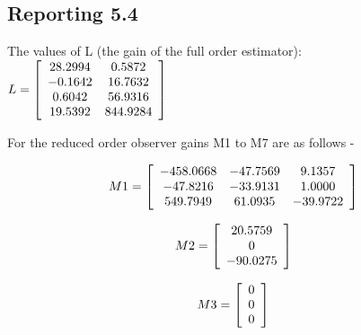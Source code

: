 \documentclass[11pt]{article}
\begin{document}
\subsection*{Reporting 5.4}

\begin{par}


    The values of L (the gain of the full order estimator):$L=\left\lbrack \begin{array}{cc}\linebreak 
28. 2994 & 0. 5872\\\linebreak 
-0. 1642 & 16. 7632\\\linebreak 
0. 6042 & 56. 9316\\\linebreak 
19. 5392 & 844. 9284\linebreak 
\end{array}\right\rbrack$
\newline

For the reduced order observer gains M1 to M7 are as follows - 

$$M1=\left\lbrack \begin{array}{ccc}\linebreak 
-458. 0668 & -47. 7569 & 9. 1357\\\linebreak 
-47. 8216 & -33. 9131 & 1. 0000\\\linebreak 
549. 7949 & 61. 0935 & -39. 9722\linebreak 
\end{array}\right\rbrack$$

$$M2=\left\lbrack \begin{array}{c}\linebreak 
20. 5759\\\linebreak 
0\\\linebreak 
-90. 0275\linebreak 
\end{array}\right\rbrack$$

$$M3=\left\lbrack \begin{array}{c}\linebreak 
0\\\linebreak 
0\\\linebreak 
0\linebreak 
\end{array}\right\rbrack$$




\end{par}
\end{document}
